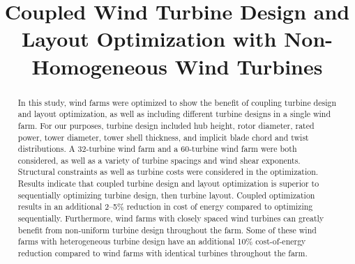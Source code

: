 \documentclass[WESD, manuscript]{copernicus}
\begin{document}
\title{Coupled Wind Turbine Design and Layout Optimization with Non-Homogeneous Wind Turbines}








\received{}
\pubdiscuss{} 
\revised{}
\accepted{}
\published{}




\maketitle



\begin{abstract}
In this study, wind farms were optimized to show the benefit of coupling turbine design and layout optimization, as well as including different turbine designs in a single wind farm. For our purposes, turbine design included hub height, rotor diameter, rated power, tower diameter, tower shell thickness, and implicit blade chord and twist distributions. A 32-turbine wind farm and a 60-turbine wind farm were both considered, as well as a variety of turbine spacings and wind shear exponents. Structural constraints as well as turbine costs were considered in the optimization. Results indicate that coupled turbine design and layout optimization is superior to sequentially optimizing turbine design, then turbine layout. Coupled optimization results in an additional  2--5\% reduction in cost of energy compared to optimizing sequentially. Furthermore, wind farms with closely spaced wind turbines can greatly benefit from non-uniform turbine design throughout the farm. Some of these wind farms with heterogeneous turbine design have an additional 10\% cost-of-energy reduction compared to wind farms with identical turbines throughout the farm.
\end{abstract}


\end{document}
